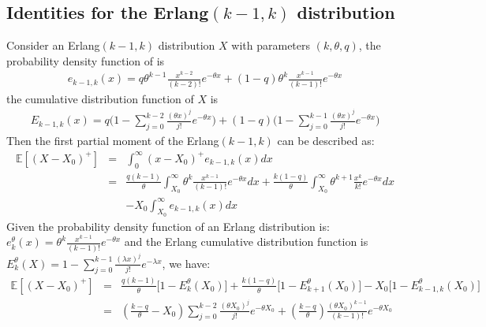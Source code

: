 \documentclass[preprint,12pt]{elsarticle}
\begin{document}
\begin{appendices}
\subsection{Identities for the Erlang$(k-1,k)$ distribution}
Consider an Erlang$(k-1,k)$ distribution $X$ with parameters $(k,\theta,q)$, the probability density function of is
\begin{eqnarray}
e_{k-1,k}(x)=q\theta^{k-1}\frac{x^{k-2}}{(k-2)!}e^{-\theta x} + (1-q)\theta^{k}\frac{x^{k-1}}{(k-1)!}e^{-\theta x} \nonumber
\end{eqnarray}
the cumulative distribution function of $X$ is
\begin{eqnarray}
E_{k-1,k}(x)=q\bigg(1-\sum_{j=0}^{k-2}\frac{(\theta x)^{j}}{j!}e^{-\theta x} \bigg)+(1-q)\bigg(1-\sum_{j=0}^{k-1}\frac{(\theta x)^{j}}{j!}e^{-\theta x} \bigg) \nonumber
\end{eqnarray}
Then the first partial moment of the Erlang$(k-1,k)$ can be described as:
\begin{eqnarray}
\mathbb{E}{[(X-X_{0})^{+}]} &=& \int_{0}^{\infty}{(x-X_{0})^{+}e_{k-1,k}(x)d x} \nonumber\\
&=& \frac{q(k-1)}{\theta}\int_{X_{0}}^{\infty}{\theta^{k}\frac{x^{k-1}}{(k-1)!}e^{-\theta x}dx}+\frac{k(1-q)}{\theta}\int_{X_0}^{\infty}{\theta^{k+1}\frac{x^{k}}{k!}e^{-\theta x}dx}\nonumber\\
&&-X_{0}\int_{X_{0}}^{\infty}{e_{k-1,k}(x)dx}\nonumber
\end{eqnarray}
Given the probability density function of an Erlang distribution is: $e_{k}^{\theta}(x)=\theta^{k}\frac{x^{k-1}}{(k-1)!}e^{-\theta x}$ and the Erlang cumulative distribution function is $E_{k}^{\theta}(X) = 1-\sum_{j=0}^{k-1}{\frac{(\lambda x)^{j}}{j!}e^{-\lambda x}}$, we have:
\begin{eqnarray}
\mathbb{E}{[(X-X_{0})^{+}]}
&=& \frac{q(k-1)}{\theta}\bigg[1-E_{k}^{\theta}(X_{0})\bigg]+\frac{k(1-q)}{\theta}\bigg[1-E_{k+1}^{\theta}(X_{0})\bigg]-X_{0}\bigg[1-E_{k-1,k}^{\theta}(X_{0})\bigg] \nonumber\\
&=&(\frac{k-q}{\theta}-X_{0})\sum_{j=0}^{k-2}{\frac{(\theta X_{0})^j}{j!}e^{-\theta X_{0}}}+(\frac{k-q}{\theta})\frac{(\theta X_{0})^{k-1}}{(k-1)!}e^{-\theta X_{0}}\nonumber
\end{eqnarray}



\end{appendices}
\end{document}
